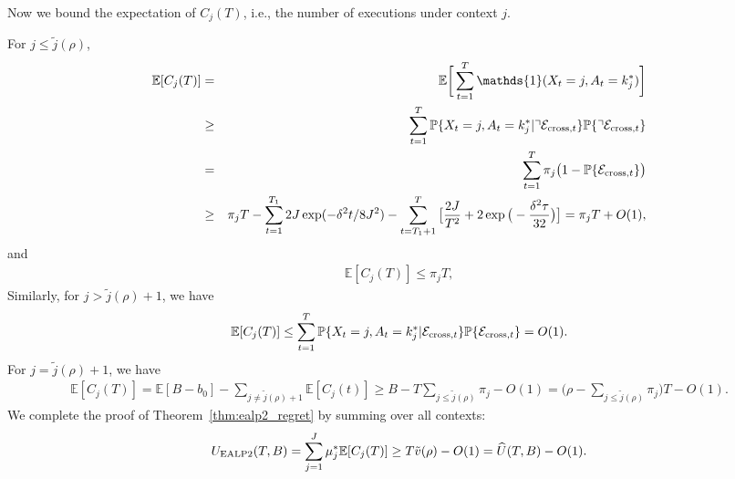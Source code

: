 Now we bound the expectation of $C_j(T)$, i.e., the number of executions under context $j$.

For $j \leq \tilde{j}(\rho)$,
\begin{eqnarray}
\mathbb{E}[C_j(T)]& =& \mathbb{E}\bigg[\sum_{t=1}^T \mathds{1}(X_t=j, A_t=k_j^*)\bigg] \nonumber\\
&\geq& \sum_{t=1}^T \mathbb{P}\{X_t=j, A_t=k_j^*|\urcorner\mathcal{E}_{{\rm cross},t}\} \mathbb{P}\{\urcorner\mathcal{E}_{{\rm cross},t}\} \nonumber \\
&= & \sum_{t=1}^T\pi_j\big(1- \mathbb{P}\{\mathcal{E}_{{\rm cross},t}\}\big)\nonumber\\
&\geq& \pi_j T - \sum_{t=1}^{T_1}2J\exp(-\delta^2t/8J^2) - \sum_{t=T_1+1}^{T}\big[\frac{2J}{T^2} + 2\exp\big(-\frac{\delta^2\tau}{32}\big)\big] = \pi_j T + O(1), \nonumber
\end{eqnarray}
and
\begin{eqnarray}
\mathbb{E}[C_j(T)]\leq \pi_j T, \nonumber
\end{eqnarray}
Similarly, for $j > \tilde{j}(\rho)+1$, we have
\begin{eqnarray}
\mathbb{E}[C_j(T)] \leq \sum_{t=1}^T \mathbb{P}\{X_t=j, A_t=k_j^*|\mathcal{E}_{{\rm cross},t}\} \mathbb{P}\{\mathcal{E}_{{\rm cross},t}\} = O(1). \nonumber\\
\end{eqnarray}
For $j = \tilde{j}(\rho)+1$, we have
\begin{eqnarray}
\mathbb{E}[C_j(T)] = \mathbb{E}[B-b_0] - \sum_{j \neq \tilde{j}(\rho)+1}\mathbb{E}[C_j(t)] \geq B-T\sum_{j \leq \tilde{j}(\rho)}\pi_j -O(1) = \big(\rho - \sum_{j \leq \tilde{j}(\rho)}\pi_j\big)T - O(1). \nonumber
\end{eqnarray}
We complete the proof of Theorem~\ref{thm:ealp2_regret} by summing over all contexts:
\begin{eqnarray}
U_{\rm EALP2}(T,B) = \sum_{j=1}^J\mu_j^*\mathbb{E}[C_j(T)]\geq T\tilde{v}(\rho) - O(1) = \widehat{U}(T,B) - O(1). \nonumber
\end{eqnarray} 